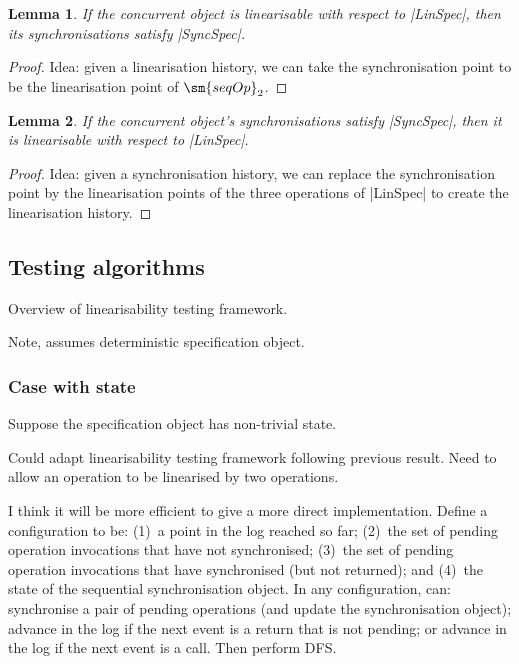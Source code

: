 \documentclass[12pt,a4paper]{article}
\newtheorem{lemma}{Lemma}
\begin{document}
\begin{lemma}
If the concurrent object is linearisable with respect to |LinSpec|, then its
synchronisations satisfy |SyncSpec|.
\end{lemma}
%
\begin{proof}
Idea: given a linearisation history, we can take the synchronisation point to
be the linearisation point of $\sm{seqOp}_2$.
\end{proof}

\begin{lemma}
If the concurrent object's synchronisations satisfy |SyncSpec|, then it is
linearisable with respect to |LinSpec|.
\end{lemma}
%
\begin{proof}
Idea: given a synchronisation history, we can replace the synchronisation
point by the linearisation points of the three operations of |LinSpec| to
create the linearisation history. 
\end{proof}




\subsection*{Testing algorithms}

Overview of linearisability testing framework. 

Note, assumes deterministic specification object. 

\subsubsection*{Case with state}

Suppose the specification object has non-trivial state. 

Could adapt linearisability testing framework following previous result.  Need
to allow an operation to be linearised by two operations.

I think it will be more efficient to give a more direct implementation.
Define a configuration to be: (1)~a point in the log reached so far; (2)~the
set of pending operation invocations that have not synchronised; (3)~the set
of pending operation invocations that have synchronised (but not returned);
and (4)~the state of the sequential synchronisation object.  In any
configuration, can: synchronise a pair of pending operations (and update the
synchronisation object); advance in the log if the next event is a return that
is not pending; or advance in the log if the next event is a call.  Then
perform DFS.
\end{document}
